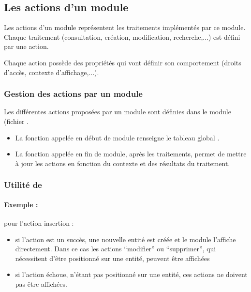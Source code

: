 

\subsection{Les actions d'un module}
\label{actions}

Les actions d'un module représentent les traitements implémentés par ce module. Chaque traitement (consultation, création, modification, recherche,...) est défini par une action.

Chaque action possède des propriétés qui vont définir son comportement (droits d'accès, contexte d'affichage,...).


\subsubsection{Gestion des actions par un module}

Les différentes actions proposées par un module sont définies dans le module (fichier .

\begin{itemize}
\item La fonction  appelée en début de module renseigne le tableau global .

\item La fonction  appelée en fin de module, après les traitements, permet de mettre à jour les actions en fonction du contexte et des résultats du traitement.
\end{itemize}

\subsubsection{Utilité de }

\paragraph{Exemple :} pour l'action insertion :
\begin{itemize}
\item si l'action est un succès, une nouvelle entité est créée et le module l'affiche directement. Dans ce cas les actions ``modifier'' ou ``supprimer'', qui nécessitent d'être positionné sur une entité, peuvent être affichées
\item si l'action échoue, n'étant pas positionné sur une entité, ces actions ne doivent pas être affichées.
\end{itemize}

